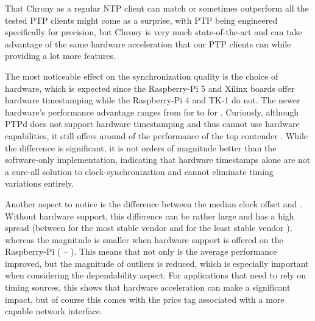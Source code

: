 %
That Chrony as a regular NTP client can match or sometimes outperform all the tested PTP clients might come as a surprise, with PTP being engineered specifically for precision, but Chrony is very much state-of-the-art and can take advantage of the same hardware acceleration that our PTP clients can while providing a lot more features.


The most noticeable effect on the synchronization quality is the choice of hardware, which is expected since the Raspberry-Pi 5 and Xilinx boards offer hardware timestamping while the Raspberry-Pi 4 and TK-1 do not. The newer hardware's performance advantage ranges from \fRatio{\cmpMin} for \fVendor{\cmpMinArg} to \fRatio{\cmpMax} for \fVendor{\cmpMaxArg}. Curiously, although PTPd does not support hardware timestamping and thus cannot use hardware capabilities, it still offers around  of the performance of the top contender . While the difference is significant, it is not orders of magnitude better than the software-only implementation, indicating that hardware timestamps alone are not a cure-all solution to clock-synchronization and cannot eliminate timing variations entirely.


%
Another aspect to notice is the difference between the median clock offset and \PNineFive{}. Without hardware support, this difference can be rather large and has a high spread (between \fRatio{\cmpMin} for the most stable vendor \fVendor{\cmpMinArg} and \fRatio{\cmpMax} for the least stable vendor \fVendor{\cmpMaxArg}),
whereas the magnitude is smaller when hardware support is offered on the Raspberry-Pi %
%
(\fRatio[1]{\cmpMin} \fVendor{\cmpMinArg} -- \fRatio[1]{\cmpMax} \fVendor{\cmpMaxArg}).
This means that not only is the average performance improved, but the magnitude of outliers is reduced, which is especially important when considering the dependability aspect. For applications that need to rely on timing sources, this shows that hardware acceleration can make a significant impact, but of course this comes with the price tag associated with a more capable network interface.

